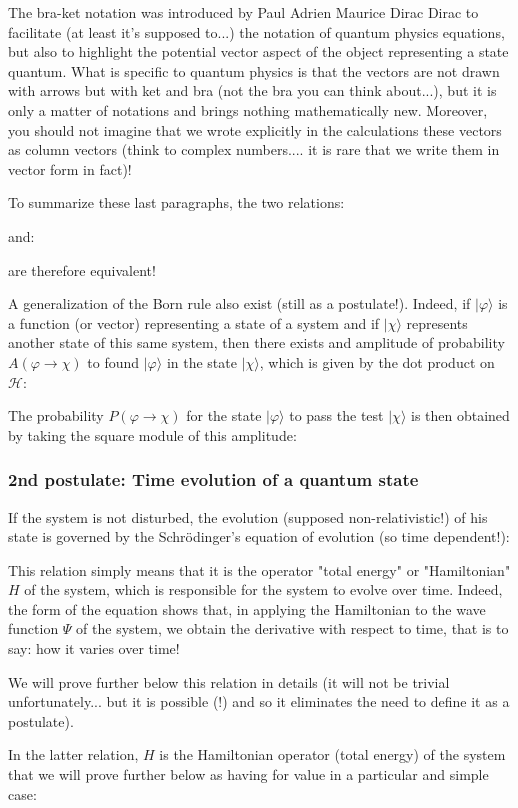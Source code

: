 	
	
	\begin{tcolorbox}[title=Remark,colframe=black,arc=10pt]
	The bra-ket notation was introduced by Paul Adrien Maurice Dirac Dirac to facilitate (at least it's supposed to...) the notation of quantum physics equations, but also to highlight the potential vector aspect of the object representing a state quantum. What is specific to quantum physics is that the vectors are not drawn with arrows but with ket and bra (not the bra you can think about...), but it is only a matter of notations and brings nothing mathematically new. Moreover, you should not imagine that we wrote explicitly in the calculations these vectors as column vectors (think to complex numbers.... it is rare that we write them in vector form in fact)!
	\end{tcolorbox}
	
	To summarize these last paragraphs, the two relations:
	
	and:
	
	are therefore equivalent!
	
	A generalization of the Born rule also exist (still as a postulate!). Indeed, if $|\varphi\rangle$ is a function (or vector) representing a state of a system and if $|\chi\rangle$ represents another state of this same system, then there exists and amplitude of probability\label{amplitude of probability} $A(\varphi\rightarrow \chi)$ to found $|\varphi\rangle$ in the state $|\chi\rangle$, which is given by the dot product on $\mathcal{H}$:
	
	The probability $P(\varphi\rightarrow \chi)$ for the state $|\varphi\rangle$ to pass the test $|\chi\rangle$ is then obtained by taking the square module of this amplitude:
	
	
	\subsubsection{2nd postulate: Time evolution of a quantum state}
	If the system is not disturbed, the evolution (supposed non-relativistic!) of his state is governed by the Schrödinger's equation of evolution (so time dependent!):
	
	This relation simply means that it is the operator "total energy" or "Hamiltonian" $H$ of the system, which is responsible for the system to evolve over time. Indeed, the form of the equation shows that, in applying the Hamiltonian to the wave function $\Psi$ of the system, we obtain the derivative with respect to time, that is to say: how it varies over time!
	\begin{tcolorbox}[title=Remark,colframe=black,arc=10pt]
	We will prove further below this relation in details (it will not be trivial unfortunately... but it is possible (!) and so it eliminates the need to define it as a postulate).
	\end{tcolorbox}
	In the latter relation, $H$ is the Hamiltonian operator (total energy) of the system that we will prove further below as having for value in a particular and simple case\label{hamiltonian operator wave quantum physics}:
	
